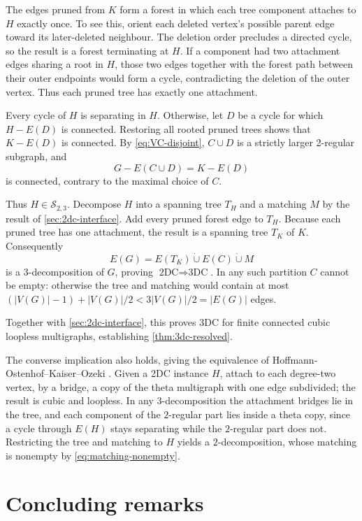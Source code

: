 \documentclass[a4paper,11pt]{article}
\newcommand{\abs}[1]{\left\lvert#1\right\rvert}
\newcommand{\dcup}{\mathbin{\dot\cup}}         %
\numberwithin{equation}{section}
\begin{document}
The edges pruned from $K$ form a forest in which each tree component attaches to
$H$ exactly once. To see this, orient each deleted vertex's possible parent edge
toward its later-deleted neighbour. The deletion order precludes a directed
cycle, so the result is a forest terminating at $H$. If a component had two
attachment edges sharing a root in $H$, those two edges together with the forest
path between their outer endpoints would form a cycle, contradicting the deletion
of the outer vertex. Thus each pruned tree has exactly one attachment.

Every cycle of $H$ is separating in $H$. Otherwise, let $D$ be a cycle for which
$H-E(D)$ is connected. Restoring all rooted pruned trees shows that $K-E(D)$ is
connected. By \cref{eq:VC-disjoint}, $C\cup D$ is a strictly larger 2-regular
subgraph, and
\[
  G-E(C\cup D)=K-E(D)
\]
is connected, contrary to the maximal choice of $C$.

Thus $H\in\mathcal S_{2,3}$. Decompose $H$ into
a spanning tree $T_H$ and a matching $M$ by the result of
\cref{sec:2dc-interface}. Add every pruned forest edge to $T_H$. Because each
pruned tree has one attachment, the result is a spanning tree $T_K$ of $K$.
Consequently
\[
  E(G)=E(T_K)\dcup E(C)\dcup M
\]
is a $3$-decomposition of $G$, proving $\text{2DC}\Rightarrow\text{3DC}$. In any
such partition $C$ cannot be empty: otherwise the tree and matching would
contain at most $(\abs{V(G)}-1)+\abs{V(G)}/2<3\abs{V(G)}/2=\abs{E(G)}$ edges.

Together with \cref{sec:2dc-interface}, this proves 3DC for finite
connected cubic loopless multigraphs, establishing \cref{thm:3dc-resolved}.

\begin{remark}
  The converse implication also holds, giving the equivalence of
  Hoffmann-Ostenhof--Kaiser--Ozeki
  \cite[Proposition~14]{HoffmannOstenhofKaiserOzeki2018}. Given a 2DC instance
  $H$, attach to each degree-two vertex, by a bridge, a copy of the theta
  multigraph with one edge subdivided; the result is cubic and loopless. In any
  $3$-decomposition the attachment bridges lie in the tree, and each component
  of the $2$-regular part lies inside a theta copy, since a cycle through
  $E(H)$ stays separating while the $2$-regular part does not. Restricting the
  tree and matching to $H$ yields a $2$-decomposition, whose matching is
  nonempty by \cref{eq:matching-nonempty}.
\end{remark}


\section{Concluding remarks}\label{sec:scope}
\end{document}
